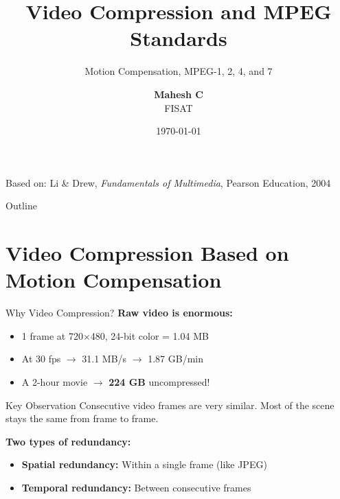 \documentclass[aspectratio=169,12pt]{beamer}
\title[Video Compression \& MPEG]{Video Compression and MPEG Standards}
\subtitle{Motion Compensation, MPEG-1, 2, 4, and 7}
\author[Mahesh C]{\textbf{Mahesh C}\\FISAT}
\institute{Federal Institute of Science and Technology (FISAT)\\Multimedia Technology Class}
\date{\today}
\begin{document}
\begin{frame}
    \titlepage
    \begin{center}
        \small Based on: Li \& Drew, \textit{Fundamentals of Multimedia}, Pearson Education, 2004
    \end{center}
\end{frame}

\begin{frame}{Outline}
    \tableofcontents
\end{frame}


\section{Video Compression Based on Motion Compensation}

\begin{frame}{Why Video Compression?}
    \textbf{Raw video is enormous:}
    \begin{itemize}
        \item 1 frame at 720$\times$480, 24-bit color = 1.04 MB
        \item At 30 fps $\rightarrow$ 31.1 MB/s $\rightarrow$ 1.87 GB/min
        \item A 2-hour movie $\rightarrow$ \textbf{224 GB} uncompressed!
    \end{itemize}
    
    \vspace{0.3cm}
    \begin{block}{Key Observation}
        Consecutive video frames are very similar. Most of the scene stays the same from frame to frame.
    \end{block}
    
    \vspace{0.3cm}
    \textbf{Two types of redundancy:}
    \begin{itemize}
        \item \textbf{Spatial redundancy:} Within a single frame (like JPEG)
        \item \textbf{Temporal redundancy:} Between consecutive frames
    \end{itemize}
\end{frame}
\end{document}
